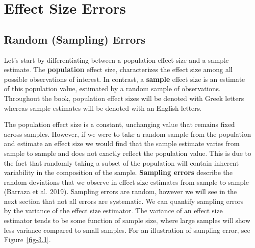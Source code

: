 \documentclass[
  letterpaper,
  DIV=11,
  numbers=noendperiod]{scrreprt}
\begin{document}
\hypertarget{effect-size-errors}{%
\section{Effect Size Errors}\label{effect-size-errors}}

\hypertarget{random-sampling-errors}{%
\subsection{Random (Sampling) Errors}\label{random-sampling-errors}}

Let's start by differentiating between a population effect size and a
sample estimate. The \textbf{population} effect size, characterizes the
effect size among all possible observations of interest. In contrast, a
\textbf{sample} effect size is an estimate of this population value,
estimated by a random sample of observations. Throughout the book,
population effect sizes will be denoted with Greek letters whereas
sample estimates will be denoted with an English letters.

The population effect size is a constant, unchanging value that remains
fixed across samples. However, if we were to take a random sample from
the population and estimate an effect size we would find that the sample
estimate varies from sample to sample and does not exactly reflect the
population value. This is due to the fact that randomly taking a subset
of the population will contain inherent variability in the composition
of the sample. \textbf{Sampling errors} describe the random deviations
that we observe in effect size estimates from sample to sample (Barraza
et al. 2019). Sampling errors are random, however we will see in the
next section that not all errors are systematic. We can quantify
sampling errors by the variance of the effect size estimator. The
variance of an effect size estimator tends to be some function of sample
size, where large samples will show less variance compared to small
samples. For an illustration of sampling error, see
Figure~\ref{fig-3.1}.
\end{document}
